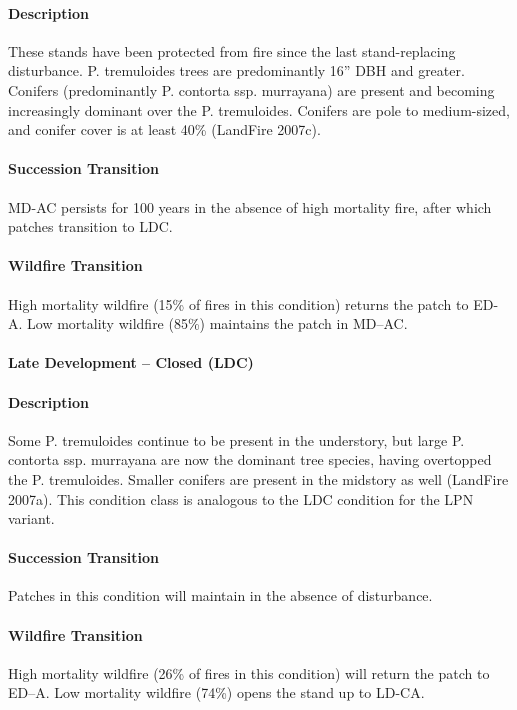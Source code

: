 \paragraph{Description} These stands have been protected from fire since the last stand-replacing disturbance. P. tremuloides trees are predominantly 16'' DBH and greater. Conifers (predominantly P. contorta ssp. murrayana) are present and becoming increasingly dominant over the P. tremuloides. Conifers are pole to medium-sized, and conifer cover is at least 40\% (LandFire 2007c).

\paragraph{Succession Transition} MD-AC persists for 100 years in the absence of high mortality fire, after which patches transition to LDC. 

\paragraph{Wildfire Transition} High mortality wildfire (15\% of fires in this condition) returns the patch to ED-A. Low mortality wildfire (85\%) maintains the patch in MD–AC.

\noindent\hrulefill

\paragraph{Late Development – Closed (LDC)}

\paragraph{Description} Some P. tremuloides continue to be present in the understory, but large P. contorta ssp. murrayana are now the dominant tree species, having overtopped the P. tremuloides. Smaller conifers are present in the midstory as well (LandFire 2007a). This condition class is analogous to the LDC condition for the LPN variant.

\paragraph{Succession Transition} Patches in this condition will maintain in the absence of disturbance.

\paragraph{Wildfire Transition} High mortality wildfire (26\% of fires in this condition) will return the patch to ED–A. Low mortality wildfire (74\%) opens the stand up to LD-CA.

